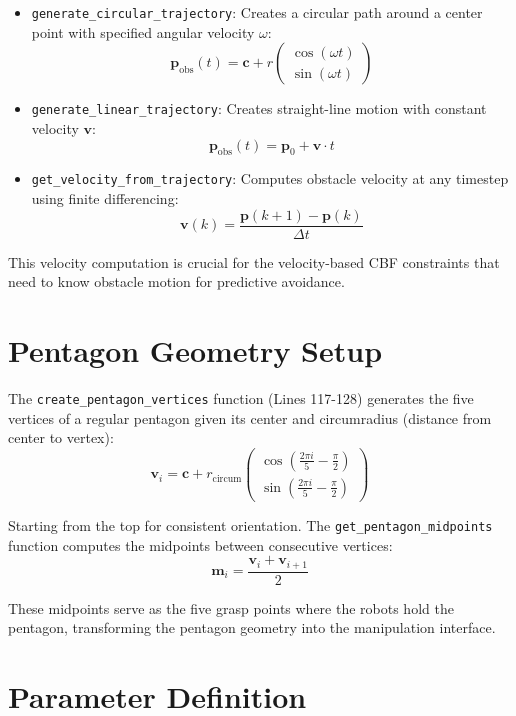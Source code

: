 \documentclass[12pt,a4paper]{article}
\begin{document}
\begin{itemize}
    \item \texttt{generate\_circular\_trajectory}: Creates a circular path around a center point with specified angular velocity $\omega$:
    \[
    \mathbf{p}_{\text{obs}}(t) = \mathbf{c} + r \begin{pmatrix} \cos(\omega t) \\ \sin(\omega t) \end{pmatrix}
    \]
    
    \item \texttt{generate\_linear\_trajectory}: Creates straight-line motion with constant velocity $\mathbf{v}$:
    \[
    \mathbf{p}_{\text{obs}}(t) = \mathbf{p}_0 + \mathbf{v} \cdot t
    \]
    
    \item \texttt{get\_velocity\_from\_trajectory}: Computes obstacle velocity at any timestep using finite differencing:
    \[
    \mathbf{v}(k) = \frac{\mathbf{p}(k+1) - \mathbf{p}(k)}{\Delta t}
    \]
\end{itemize}

This velocity computation is crucial for the velocity-based CBF constraints that need to know obstacle motion for predictive avoidance.

\section{Pentagon Geometry Setup}

The \texttt{create\_pentagon\_vertices} function (Lines 117-128) generates the five vertices of a regular pentagon given its center and circumradius (distance from center to vertex):
\[
\mathbf{v}_i = \mathbf{c} + r_{\text{circum}} \begin{pmatrix} \cos\left(\frac{2\pi i}{5} - \frac{\pi}{2}\right) \\ \sin\left(\frac{2\pi i}{5} - \frac{\pi}{2}\right) \end{pmatrix}
\]

Starting from the top for consistent orientation. The \texttt{get\_pentagon\_midpoints} function computes the midpoints between consecutive vertices:
\[
\mathbf{m}_i = \frac{\mathbf{v}_i + \mathbf{v}_{i+1}}{2}
\]

These midpoints serve as the five grasp points where the robots hold the pentagon, transforming the pentagon geometry into the manipulation interface.

\section{Parameter Definition}
\end{document}
